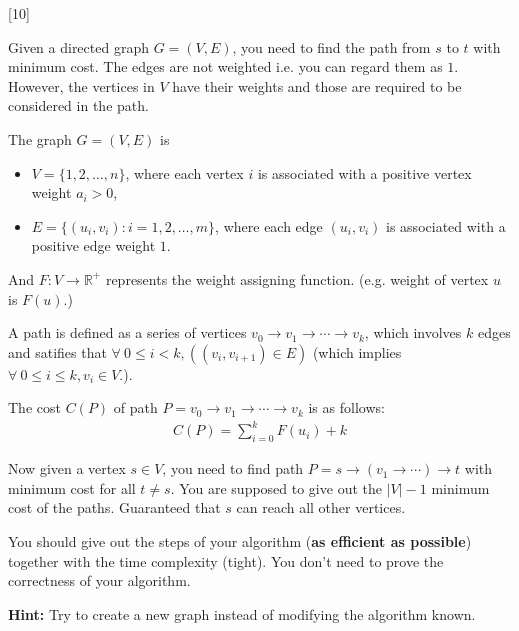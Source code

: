 [10]

Given a directed graph $G = (V, E)$, you need to find the path from $s$ to $t$ with minimum cost. The edges are not weighted i.e. you can regard them as $1$. However, the vertices in $V$ have their weights and those are required to be considered in the path.

The graph $G = (V, E)$ is
\begin{itemize}
    \item $V=\{1,2,\ldots, n\}$, where each vertex $i$ is associated with a positive vertex weight $a_i > 0$,
    \item $E=\{(u_i,v_i):i=1,2,\ldots, m\}$, where each edge $(u_i, v_i)$ is associated with a positive edge weight $1$.
\end{itemize}
And $F: V\to \mathbb{R}^+$ represents the weight assigning function. (e.g. weight of vertex $u$ is $F(u)$.)

A path is defined as a series of vertices $v_0\to v_1\to \cdots\to v_k$, which involves $k$ edges and satifies that $\forall\ 0\leq i <k, ((v_i,v_{i+1})\in E)$ (which implies $\forall\ 0\leq i \leq k, v_i\in V$.).

The cost $C(P)$ of path $P = v_0 \to v_1 \to \cdots \to v_k$ is as follows:
\begin{align*}
    C(P) = \sum_{i=0}^k F(u_i) + k
\end{align*}

Now given a vertex $s\in V$, you need to find path $P = s \to (v_1 \to \cdots ) \to t$ with minimum cost for all $t \not = s$.
You are supposed to give out the $|V|-1$ minimum cost of the paths. Guaranteed that $s$ can reach all other vertices.

You should give out the steps of your algorithm (\textbf{as efficient as possible}) together with the time complexity (tight). You don't need to prove the correctness of your algorithm.


\textbf{Hint:} Try to create a new graph instead of modifying the algorithm known.
\begin{solution} \\
    \vspace{2in}

\end{solution}